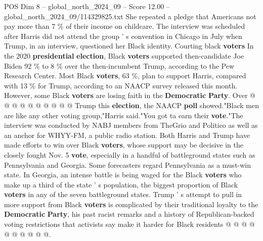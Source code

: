 \begin{textsample}{POS Dim 8 – global\_north\_2024\_09 – Score 12.00 – global\_north\_2024\_09/114329825.txt}
She repeated a pledge that Americans not pay more than 7 \% of their income on childcare.
The interview was scheduled after Harris did not attend the group ' s convention in Chicago in July when Trump, in an interview, questioned her Black identity.
Courting black \textbf{voters} In the 2020 \textbf{presidential} \textbf{election}, Black \textbf{voters} supported then-candidate Joe Biden 92 \% to 8 \% over the then-incumbent Trump, according to the Pew Research Center.
Most Black \textbf{voters}, 63 \%, plan to support Harris, compared with 13 \% for Trump, according to an NAACP survey released this month.
However, some Black \textbf{voters} are losing faith in the \textbf{Democratic} \textbf{Party}.
Over @ @ @ @ @ @ @ @ @ @ Trump this \textbf{election}, the NAACP \textbf{poll} showed."Black men are like any other voting group,"Harris said."You got ta earn their \textbf{vote}."The interview was conducted by NABJ members from TheGrio and Politico as well as an anchor for WHYY-FM, a public radio station.
Both Harris and Trump have made efforts to win over Black \textbf{voters}, whose support may be decisive in the closely fought Nov. 5 \textbf{vote}, especially in a handful of battleground states such as Pennsylvania and Georgia.
Some forecasters regard Pennsylvania as a must-win state.
In Georgia, an intense battle is being waged for the Black \textbf{voters} who make up a third of the state ' s population, the biggest proportion of Black \textbf{voters} in any of the seven battleground states.
Trump ' s attempt to pull in more support from Black \textbf{voters} is complicated by their traditional loyalty to the \textbf{Democratic} \textbf{Party}, his past racist remarks and a history of Republican-backed voting restrictions that activists say make it harder for Black residents @ @ @ @ @ @ @ @ @ @.

\end{textsample}
